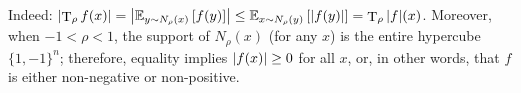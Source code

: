\documentclass[12pt]{article}
\newcommand{\fbitset}{\{1,-1\}}
\newcommand{\E}[2][]{\mathbb E_{#1}\left[#2\right]}
\DeclareMathOperator{\T}{T}
\begin{document}
\subsection{}

\subsection{}

\subsection{}

\subsection{}

\subsection{}

\subsection{}

\subsection{}

\subsection{}

\subsection{}

\subsection{}

\subsection{}

\subsection{}
Indeed: $\abs{\T_\rho f(x)} = \abs{\E[y \sim N_\rho(x)]{f(y)}} \leq \E[x \sim N_\rho(y)]{\abs{f(y)}} = \T_\rho \abs{f}(x)$. Moreover, when $-1 < \rho < 1$, the support of $N_\rho(x)$ (for any $x$) is the entire hypercube $\fbitset^n$; therefore, equality implies $\abs{f(x)} \geq 0$ for all $x$, or, in other words, that $f$ is either non-negative or non-positive.
\end{document}
